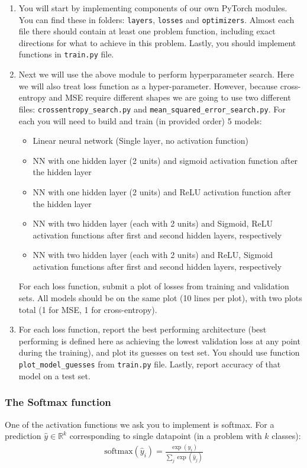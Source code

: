 \documentclass{article}
\begin{document}
\begin{aprob}
    \begin{enumerate}
        \item {} You will start by implementing components of our own PyTorch modules. You can find these in folders: \texttt{layers}, \texttt{losses} and \texttt{optimizers}. Almost each file there should contain at least one problem function, including exact directions for what to achieve in this problem. Lastly, you should implement functions in \texttt{train.py} file.
        \item {} Next we will use the above module to perform hyperparameter search. Here we will also treat loss function as a hyper-parameter. However, because cross-entropy and MSE require different shapes we are going to use two different files: \texttt{crossentropy\_search.py} and \texttt{mean\_squared\_error\_search.py}.
        For each you will need to build and train (in provided order) 5 models:
        \begin{itemize}
            \item Linear neural network (Single layer, no activation function)
            \item NN with one hidden layer (2 units) and sigmoid activation function after the hidden layer
            \item NN with one hidden layer (2 units) and ReLU activation function after the hidden layer
            \item NN with two hidden layer (each with 2 units) and Sigmoid, ReLU activation functions after first and second hidden layers, respectively
            \item NN with two hidden layer (each with 2 units) and ReLU, Sigmoid activation functions after first and second hidden layers, respectively
        \end{itemize}
        For each loss function, submit a plot of losses from training and validation sets. All models should be on the same plot (10 lines per plot), with two plots total (1 for MSE, 1 for cross-entropy).
        \item {} For each loss function, report the best performing architecture (best performing is defined here as achieving the lowest validation loss at any point during the training), and plot its guesses on test set. You should use function \texttt{plot\_model\_guesses} from \texttt{train.py} file. Lastly, report accuracy of that model on a test set.
    \end{enumerate}
    
    \subsubsection*{The Softmax function}
    One of the activation functions we ask you to implement is softmax. For a prediction $\hat{y} \in \mathbb{R}^k$ corresponding to single datapoint (in a problem with $k$ classes):
    \begin{align*}
        \text{softmax}(\hat{y}_i) = \frac{\exp(\hat{y}_i)}{\sum_j \exp(\hat{y}_j)}
    \end{align*}
    

\end{aprob}
\end{document}
